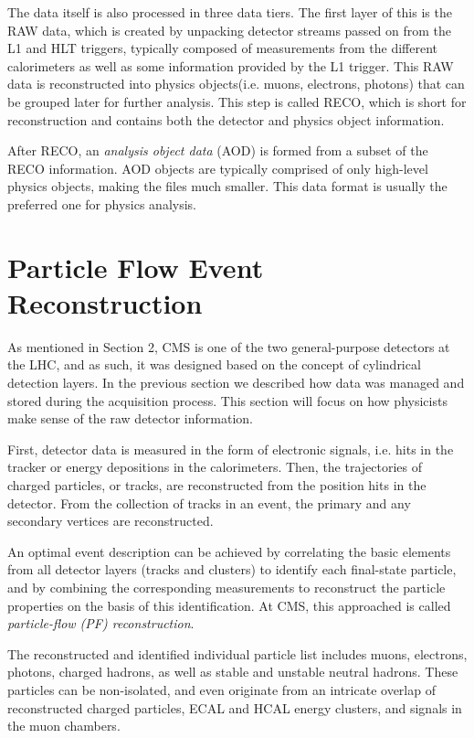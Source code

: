  The data itself is also processed in three data tiers. The first layer of this is the RAW data, which is created by unpacking detector streams passed on from the L1 and HLT triggers, typically composed of measurements from the different calorimeters as well as some information provided by the L1 trigger. This RAW data is reconstructed into physics objects(i.e. muons, electrons, photons) that can be grouped later for further analysis. This step is called RECO, which is short for reconstruction and contains both the detector and physics object information. 

 After RECO, an \textit{analysis object data} (AOD) is formed from a subset of the RECO information. AOD objects are typically comprised of only high-level physics objects, making the files much smaller. This data format is usually the preferred one for physics analysis.



\section{Particle Flow Event Reconstruction}
\label{sec:track}

As mentioned in Section 2, CMS is one of the two general-purpose detectors at the LHC, and as such, it was designed based on the concept of cylindrical detection layers. In the previous section we described how data was managed and stored during the acquisition process. This section will focus on how physicists make sense of the raw detector information.  

 First, detector data is measured in the form of electronic signals, i.e. hits in the tracker or energy depositions in the calorimeters. Then, the trajectories of charged particles, or tracks, are reconstructed from the position hits in the detector. From the collection of tracks in an event, the primary and any secondary vertices are reconstructed. 

An optimal event description can be achieved by correlating the basic elements from all detector layers (tracks and clusters) to identify each final-state particle, and by combining the corresponding measurements to reconstruct the particle properties on the basis of this identification. At CMS, this approached is called \textit{particle-flow (PF) reconstruction}.

The reconstructed and identified individual particle list includes muons, electrons, photons, charged hadrons, as well as stable and unstable neutral hadrons. These particles can be non-isolated, and even originate from an intricate overlap of reconstructed charged particles, ECAL and HCAL energy clusters, and signals in the muon chambers.

